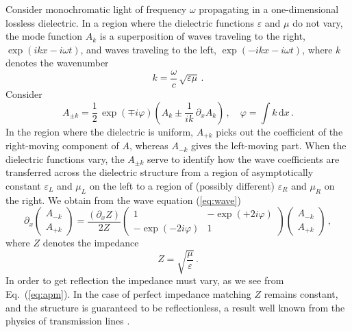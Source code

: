 \documentclass[12pt,amsmath,amssymb]{article}
\numberwithin{equation}{section}
\begin{document}
Consider monochromatic light of frequency $\omega$ propagating
in a one-dimensional lossless dielectric. In a region where the dielectric
functions $\varepsilon$ and $\mu$ do not vary, the mode function $A_k$
is a superposition of waves traveling to the right, $\exp(ikx-i\omega t)$,
and waves traveling to the left, $\exp(-ikx-i\omega t)$, where $k$ denotes
the wavenumber
\begin{equation}
k=\frac{\omega}{c}\,\sqrt{\varepsilon\mu} \,.
\end{equation}
Consider \cite{Bandelow}
\begin{equation}
A_{\pm k} = \frac{1}{2}\,\exp\left({\mp i\varphi}\right) \left(A_k \pm
\frac{1}{ik}\,\partial_x A_k\right)\,,\quad
\varphi = \int k\,\mathrm{d}x\,.
\end{equation}
In the region where the dielectric is uniform, $A_{+k}$ picks out
the coefficient of the right-moving component of $A$,
whereas $A_{-k}$ gives the left-moving part.
When the dielectric functions vary, the $A_{\pm k}$ serve to
identify how the wave coefficients are transferred across the dielectric
structure from a region of asymptotically constant
$\varepsilon_L$ and $\mu_L$ on the left to a region of
(possibly different) $\varepsilon_R$ and $\mu_R$ on the right.
We obtain from the wave equation (\ref{eq:wave})
\begin{equation}
\label{eq:apm}
\partial_x
\left(
    \begin{array}{c}
      A_{-k} \\
      A_{+k}
    \end{array}
\right)
=
\frac{(\partial_x Z)}{2Z}
\left(
    \begin{array}{cc}
      1 & -\exp(+2i\varphi) \\
      -\exp(-2i\varphi) & 1
    \end{array}
\right)
\left(
    \begin{array}{c}
      A_{-k} \\
      A_{+k}
    \end{array}
\right)\,,
\end{equation}
where $Z$ denotes the impedance \cite{Jackson}
\begin{equation}
Z = \sqrt{\frac{\mu}{\varepsilon}}\,.
\end{equation}
In order to get reflection the impedance must vary, as we see from
Eq.\ (\ref{eq:apm}). In the case of perfect impedance matching
$Z$ remains constant, and the structure is guaranteed to be reflectionless,
a result well known from the physics of transmission lines \cite{Jackson}.
\end{document}
